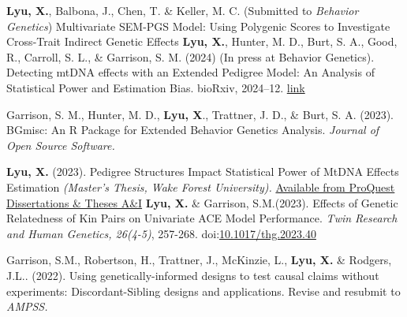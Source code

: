 

\begin{cvpublications}
  \cvpublication
    {\bullet \textbf{Lyu, X.}, Balbona, J., Chen, T. \& Keller, M. C. (Submitted to \textit{Behavior Genetics}) Multivariate SEM-PGS Model: Using Polygenic Scores to Investigate Cross-Trait Indirect Genetic Effects} 
  \cvpublication
    {\bullet \textbf{Lyu, X.}, Hunter, M. D., Burt, S. A., Good, R., Carroll, S. L., \& Garrison, S. M. (2024) (In press at Behavior Genetics). Detecting mtDNA effects with an Extended Pedigree Model: An Analysis of Statistical Power and Estimation Bias. bioRxiv, 2024–12. \href{https://www.biorxiv.org/content/10.1101/2024.12.19.629449v1.abstract}{link}} 
    
  \cvpublication
    {\bullet Garrison, S. M., Hunter, M. D., \textbf{Lyu, X}., Trattner, J. D., \& Burt, S. A. (2023). BGmisc: An R Package for Extended Behavior Genetics Analysis. \textit{Journal of Open Source Software.}} 
    
  \cvpublication
    {\bullet \textbf{Lyu, X. }(2023). Pedigree Structures Impact Statistical Power of MtDNA Effects Estimation \textit{(Master's Thesis, Wake Forest University).} \href{https://www.proquest.com/docview/2863241367}{Available from ProQuest Dissertations \& Theses A\&I}}
  \cvpublication
    {\bullet \textbf{Lyu, X.} \& Garrison, S.M.(2023). Effects of Genetic Relatedness of Kin Pairs on Univariate ACE Model Performance. \textit{Twin Research and Human Genetics, 26(4-5)}, 257-268. doi:\href{https://www-cambridge-org.colorado.idm.oclc.org/core/journals/twin-research-and-human-genetics/article/effects-of-genetic-relatedness-of-kin-pairs-on-univariate-ace-model-performance/7B99A4A34DF4F54CDF2184676C4744AD}{10.1017/thg.2023.40}} 
    
  \cvpublication
    {\bullet Garrison, S.M., Robertson, H., Trattner, J., McKinzie, L., \textbf{Lyu, X.} \& Rodgers, J.L.. (2022). Using genetically-informed designs to test causal claims without experiments: Discordant-Sibling designs and applications. Revise and resubmit to \textit{AMPSS.}}   
    
\end{cvpublications}

